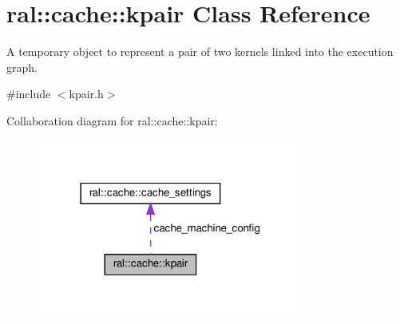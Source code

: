 \hypertarget{classral_1_1cache_1_1kpair}{}\section{ral\+:\+:cache\+:\+:kpair Class Reference}
\label{classral_1_1cache_1_1kpair}


A temporary object to represent a pair of two kernels linked into the execution graph.  




{\ttfamily \#include $<$kpair.\+h$>$}



Collaboration diagram for ral\+:\+:cache\+:\+:kpair\+:\nopagebreak
\begin{figure}[H]
\begin{center}
\leavevmode
\includegraphics[width=249pt]{classral_1_1cache_1_1kpair__coll__graph}
\end{center}
\end{figure}

